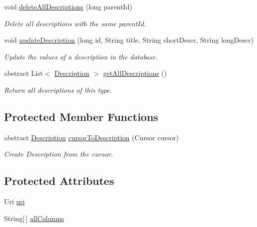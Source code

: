 \begin{DoxyCompactItemize}
void \hyperlink{classuk_1_1ac_1_1swan_1_1digitaltrails_1_1database_1_1_description_data_source_a5e81b67e1ed20a346146d36e1e94e664}{delete\+All\+Descriptions} (long parent\+Id)
\begin{DoxyCompactList}\small\item\em Delete all descriptions with the same parent\+Id. \end{DoxyCompactList}\item 
void \hyperlink{classuk_1_1ac_1_1swan_1_1digitaltrails_1_1database_1_1_description_data_source_a007f26b485f79cc640f41afe780eebc3}{update\+Description} (long id, String title, String short\+Descr, String long\+Descr)
\begin{DoxyCompactList}\small\item\em Update the values of a description in the database. \end{DoxyCompactList}\item 
abstract List$<$ \hyperlink{classuk_1_1ac_1_1swan_1_1digitaltrails_1_1components_1_1_description}{Description} $>$ \hyperlink{classuk_1_1ac_1_1swan_1_1digitaltrails_1_1database_1_1_description_data_source_a134b9b153811548f205493e00481464f}{get\+All\+Descriptions} ()
\begin{DoxyCompactList}\small\item\em Return all descriptions of this type. \end{DoxyCompactList}\end{DoxyCompactItemize}
\subsection*{Protected Member Functions}
\begin{DoxyCompactItemize}
\item 
abstract \hyperlink{classuk_1_1ac_1_1swan_1_1digitaltrails_1_1components_1_1_description}{Description} \hyperlink{classuk_1_1ac_1_1swan_1_1digitaltrails_1_1database_1_1_description_data_source_a3f5bcdc69a14876f36a0849e957b6b60}{cursor\+To\+Description} (Cursor cursor)
\begin{DoxyCompactList}\small\item\em Create Description from the cursor. \end{DoxyCompactList}\end{DoxyCompactItemize}
\subsection*{Protected Attributes}
\begin{DoxyCompactItemize}
\item 
Uri \hyperlink{classuk_1_1ac_1_1swan_1_1digitaltrails_1_1database_1_1_description_data_source_ad5ab4f6ae6c94d72a77bd53a914aa8fa}{uri}
\item 
String\mbox{[}$\,$\mbox{]} \hyperlink{classuk_1_1ac_1_1swan_1_1digitaltrails_1_1database_1_1_description_data_source_aa80b002da9e2cf4b83d25f13ca7843c0}{all\+Columns}
\end{DoxyCompactItemize}


